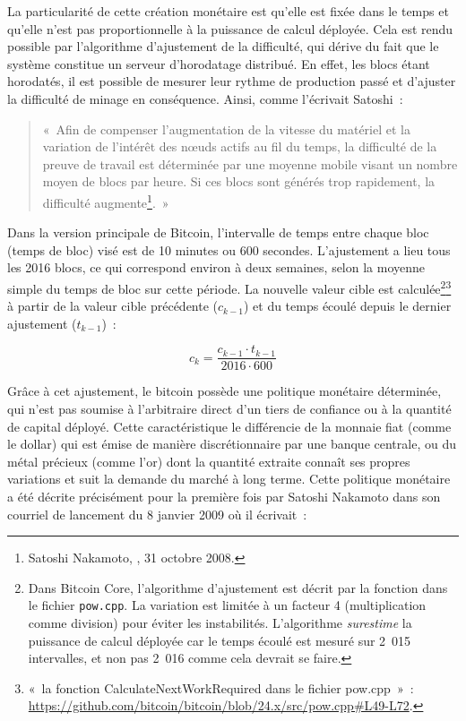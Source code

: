La particularité de cette création monétaire est qu'elle est fixée dans le temps et qu'elle n'est pas proportionnelle à la puissance de calcul déployée. Cela est rendu possible par l'algorithme d'ajustement de la difficulté, qui dérive du fait que le système constitue un serveur d'horodatage distribué. En effet, les blocs étant horodatés, il est possible de mesurer leur rythme de production passé et d'ajuster la difficulté de minage en conséquence. Ainsi, comme l'écrivait Satoshi~:

\begin{quote}
«~Afin de compenser l'augmentation de la vitesse du matériel et la variation de l'intérêt des nœuds actifs au fil du temps, la difficulté de la preuve de travail est déterminée par une moyenne mobile visant un nombre moyen de blocs par heure. Si ces blocs sont générés trop rapidement, la difficulté augmente\footnote{Satoshi Nakamoto, , 31 octobre 2008.}.~»
\end{quote}

Dans la version principale de Bitcoin, l'intervalle de temps entre chaque bloc (temps de bloc) visé est de 10 minutes ou 600 secondes. L'ajustement a lieu tous les 2016 blocs, ce qui correspond environ à deux semaines, selon la moyenne simple du temps de bloc sur cette période. La nouvelle valeur cible est calculée\footnote{Dans Bitcoin Core, l'algorithme d'ajustement est décrit par la fonction  dans le fichier \texttt{pow.cpp}. La variation est limitée à un facteur 4 (multiplication comme division) pour éviter les instabilités. L'algorithme \emph{surestime} la puissance de calcul déployée car le temps écoulé est mesuré sur 2~015 intervalles, et non pas 2~016 comme cela devrait se faire.}\footnote{«~la fonction CalculateNextWorkRequired dans le fichier pow.cpp~»~: \url{https://github.com/bitcoin/bitcoin/blob/24.x/src/pow.cpp\#L49-L72}.} à partir de la valeur cible précédente ($c_{k-1}$) et du temps écoulé depuis le dernier ajustement ($t_{k-1}$)~:

{ \footnotesize
\[
c_{k} = \frac{c_{k-1} \cdot t_{k-1}}{2016 \cdot 600}
\]
}

Grâce à cet ajustement, le bitcoin possède une politique monétaire déterminée, qui n'est pas soumise à l'arbitraire direct d'un tiers de confiance ou à la quantité de capital déployé. Cette caractéristique le différencie de la monnaie fiat (comme le dollar) qui est émise de manière discrétionnaire par une banque centrale, ou du métal précieux (comme l'or) dont la quantité extraite connaît ses propres variations et suit la demande du marché à long terme. Cette politique monétaire a été décrite précisément pour la première fois par Satoshi Nakamoto dans son courriel de lancement du 8 janvier 2009 où il écrivait~:

